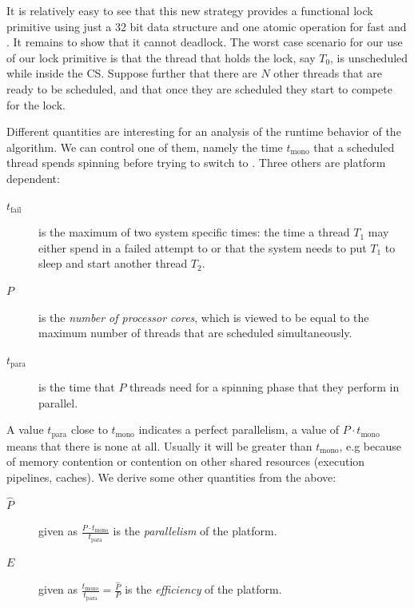 It is relatively easy to see that this new strategy provides a
functional lock primitive using just a 32 bit data structure and
one atomic operation for fast  and . It remains to
show that it cannot deadlock.
\iflong%
The worst case scenario for our use of our lock primitive is that
the thread that holds the lock, say $T_0$, is unscheduled while
inside the CS. Suppose further that there are $N$ other threads
that are ready to be scheduled, and that once they are scheduled
they start to compete for the lock.

Different quantities are interesting for an analysis of the runtime
behavior of the algorithm. We can control one of them, namely the
time $t_{\textrm{mono}}$ that a scheduled thread spends spinning
before trying to switch to .  Three others are platform
dependent:
\fi
\itemadjust
\begin{description}
\item[{$t_{\textrm{fail}}$}] is the maximum of two system specific
times: the time a thread $T_1$ may either spend in a failed
attempt to  or that the system needs to put $T_1$
to sleep and start another thread $T_2$.\itemadjust

\item[{$P$}] is the \emph{number of processor cores}, which is viewed to be
equal to the maximum number of threads that are scheduled
simultaneously.\itemadjust

\item[{$t_{\textrm{para}}$}] is the time that $P$ threads need for a
spinning phase that they perform in parallel.\itemadjust
\end{description}

\iflong%
A value $t_{\textrm{para}}$ close to $t_{\textrm{mono}}$ indicates
a perfect parallelism, a value of $P \cdot t_{\textrm{mono}}$
means that there is none at all. Usually it will be greater than
$t_{\textrm{mono}}$, e.g because of memory contention or
contention on other shared resources (execution pipelines,
caches). We derive some other quantities from the
above:\itemadjust


\begin{description}
\item[{$\widehat{P}$}] given as $\frac{P\cdot
                       t_{\textrm{mono}}}{t_{\textrm{para}}}$ is the
\emph{parallelism} of the platform.

\item[{$E$}] given as $\frac{t_\textrm{mono}}{t_{\textrm{para}}} =
             \frac{\widehat{P}}{P}$ is the \emph{efficiency} of the
platform.
\end{description}

